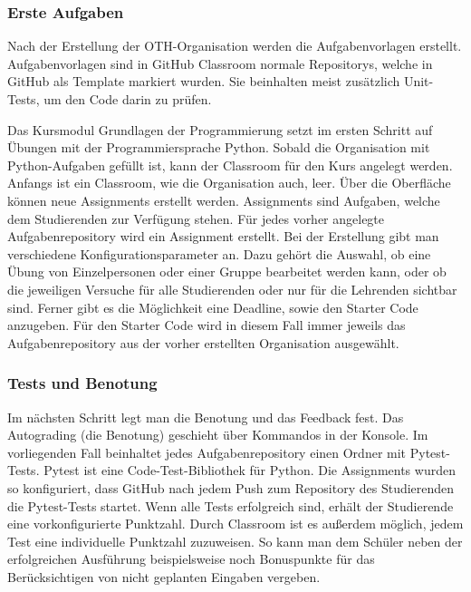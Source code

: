 \subsubsection{Erste Aufgaben}\label{classroom-erste-aufgaben}
Nach der Erstellung der OTH-Organisation werden die Aufgabenvorlagen erstellt.
Aufgabenvorlagen sind in GitHub Classroom normale Repositorys, welche in GitHub
als Template markiert wurden. Sie beinhalten meist zusätzlich Unit-Tests, um den
Code darin zu prüfen.

Das Kursmodul \glqq Grundlagen der Programmierung\grqq{} setzt im ersten Schritt
auf Übungen mit der Programmiersprache Python. Sobald die Organisation mit
Python-Aufgaben gefüllt ist, kann der Classroom für den Kurs angelegt werden.
Anfangs ist ein Classroom, wie die Organisation auch, leer. Über die Oberfläche
können neue Assignments erstellt werden. Assignments sind Aufgaben, welche dem
Studierenden zur Verfügung stehen. Für jedes vorher angelegte Aufgabenrepository
wird ein Assignment erstellt. Bei der Erstellung gibt man verschiedene
Konfigurationsparameter an. Dazu gehört die Auswahl, ob eine Übung von
Einzelpersonen oder einer Gruppe bearbeitet werden kann, oder ob die jeweiligen
Versuche für alle Studierenden oder nur für die Lehrenden sichtbar sind. Ferner
gibt es die Möglichkeit eine Deadline, sowie den Starter Code anzugeben. Für den
Starter Code wird in diesem Fall immer jeweils das Aufgabenrepository aus der
vorher erstellten Organisation ausgewählt.
\parencite{github-assignment-erstellen}

\subsubsection{Tests und Benotung}\label{classroom-tests}
Im nächsten Schritt legt man die Benotung und das Feedback fest. Das Autograding
(die Benotung) geschieht über Kommandos in der Konsole. Im vorliegenden Fall
beinhaltet jedes Aufgabenrepository einen Ordner mit Pytest-Tests. Pytest ist
eine Code-Test-Bibliothek für Python. Die Assignments wurden so konfiguriert,
dass GitHub nach jedem Push zum Repository des Studierenden die Pytest-Tests
startet. Wenn alle Tests erfolgreich sind, erhält der Studierende eine
vorkonfigurierte Punktzahl. Durch Classroom ist es außerdem möglich, jedem Test
eine individuelle Punktzahl zuzuweisen. So kann man dem Schüler neben der
erfolgreichen Ausführung beispielsweise noch Bonuspunkte für das Berücksichtigen
von nicht geplanten Eingaben vergeben. \parencite{github-assignment-erstellen}


